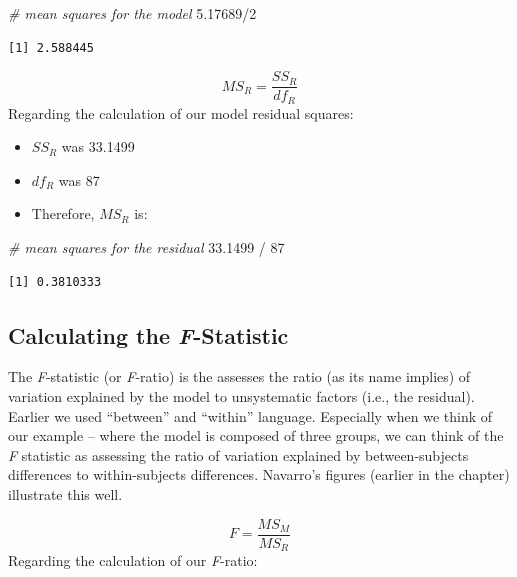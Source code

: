 \documentclass[
  english,
]{book}
\newenvironment{Shaded}{\begin{snugshade}}{\end{snugshade}}
\newcommand{\CommentTok}[1]{\textcolor[rgb]{0.56,0.35,0.01}{\textit{#1}}}
\newcommand{\DecValTok}[1]{\textcolor[rgb]{0.00,0.00,0.81}{#1}}
\newcommand{\FloatTok}[1]{\textcolor[rgb]{0.00,0.00,0.81}{#1}}
\newcommand{\SpecialCharTok}[1]{\textcolor[rgb]{0.00,0.00,0.00}{#1}}
\providecommand{\tightlist}{%
  \setlength{\itemsep}{0pt}\setlength{\parskip}{0pt}}
\begin{document}
\begin{Shaded}
\begin{Highlighting}[]
\CommentTok{\# mean squares for the model}
\FloatTok{5.17689}\SpecialCharTok{/}\DecValTok{2}
\end{Highlighting}
\end{Shaded}

\begin{verbatim}
[1] 2.588445
\end{verbatim}

\[MS_R = \frac{SS_{R}}{df{_{R}}}\]
Regarding the calculation of our model residual squares:

\begin{itemize}
\tightlist
\item
  \(SS_R\) was 33.1499
\item
  \(df_R\) was 87
\item
  Therefore, \(MS_R\) is:
\end{itemize}

\begin{Shaded}
\begin{Highlighting}[]
\CommentTok{\# mean squares for the residual}
\FloatTok{33.1499} \SpecialCharTok{/} \DecValTok{87}
\end{Highlighting}
\end{Shaded}

\begin{verbatim}
[1] 0.3810333
\end{verbatim}

\hypertarget{calculating-the-f-statistic}{%
\subsection{\texorpdfstring{Calculating the \emph{F}-Statistic}{Calculating the F-Statistic}}\label{calculating-the-f-statistic}}

The \emph{F}-statistic (or \emph{F}-ratio) is the assesses the ratio (as its name implies) of variation explained by the model to unsystematic factors (i.e., the residual). Earlier we used ``between'' and ``within'' language. Especially when we think of our example -- where the model is composed of three groups, we can think of the \emph{F} statistic as assessing the ratio of variation explained by between-subjects differences to within-subjects differences. Navarro's \citep{navarro_chapter_2020} figures (earlier in the chapter) illustrate this well.

\[F = \frac{MS_{M}}{MS_{R}}\]
Regarding the calculation of our \emph{F}-ratio:
\end{document}
